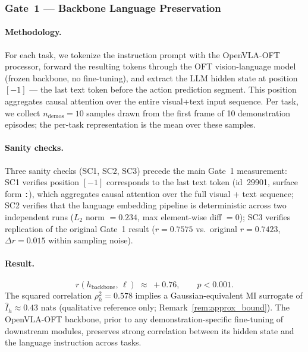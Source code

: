 \subsubsection{Gate~1 --- Backbone Language Preservation}
\label{sec:results:diagnostic:gate1}

\paragraph{Methodology.}
For each task, we tokenize the instruction prompt with the OpenVLA-OFT processor, forward
the resulting tokens through the OFT vision-language model (frozen backbone, no
fine-tuning), and extract the LLM hidden state at position $[-1]$ --- the last text token
before the action prediction segment. This position aggregates causal attention over the
entire visual+text input sequence. Per task, we collect $n_{\text{demos}} = 10$ samples
drawn from the first frame of 10 demonstration episodes; the per-task representation is
the mean over these samples.

\paragraph{Sanity checks.}
Three sanity checks (SC1, SC2, SC3) precede the main Gate~1 measurement:
SC1 verifies position $[-1]$ corresponds to the last text token (id~29901, surface form
\texttt{:}), which aggregates causal attention over the full visual + text sequence;
SC2 verifies that the language embedding pipeline is deterministic across two
independent runs ($L_2$ norm $= 0.234$, max element-wise diff $= 0$); SC3 verifies
replication of the original Gate~1 result ($r = 0.7575$ vs.\ original $r = 0.7423$,
$\Delta r = 0.015$ within sampling noise).

\paragraph{Result.}
\begin{equation}
r(h_{\mathrm{backbone}},\, \ell) \;\approx\; +0.76, \qquad p < 0.001.
\label{eq:gate1_result}
\end{equation}
The squared correlation $\rho_h^2 = 0.578$ implies a Gaussian-equivalent MI surrogate of
$\hat{I}_h \approx 0.43$ nats (qualitative reference only;
Remark~\ref{rem:approx_bound}). The OpenVLA-OFT backbone, prior to any
demonstration-specific fine-tuning of downstream modules, preserves strong correlation
between its hidden state and the language instruction across tasks.

